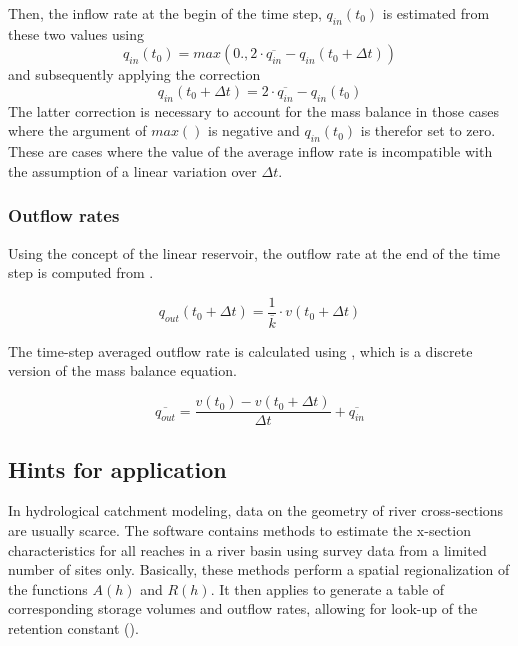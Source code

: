 Then, the inflow rate at the begin of the time step, $q_{in}(t_0)$ is estimated from these two values using
\begin{equation*}
q_{in}(t_0)= max(0., 2 \cdot \overline{q_{in}} - q_{in}(t_0 + \Delta t))
\end{equation*}
and subsequently applying the correction
\begin{equation*}
q_{in}(t_0 + \Delta t)= 2 \cdot \overline{q_{in}} - q_{in}(t_0)
\end{equation*}
The latter correction is necessary to account for the mass balance in those cases where the \second{} argument of $max()$ is negative and $q_{in}(t_0)$ is therefor set to zero. These are cases where the value of the average inflow rate is incompatible with the assumption of a linear variation over $\Delta t$.

\subsubsection*{Outflow rates}

Using the concept of the linear reservoir, the outflow rate at the end of the time step is computed from .

\begin{equation} \label{eqn:chanFlow_singleRes_outflowEnd}
  q_{out}(t_0 + \Delta t)= \frac{1}{\overline{k}} \cdot v(t_0 + \Delta t)
\end{equation}

The time-step averaged outflow rate is calculated using , which is a discrete version of the mass balance equation.

\begin{equation} \label{eqn:chanFlow_singleRes_outflowAvg}
\overline{q_{out}}= \frac{v(t_0) - v(t_0 + \Delta t)}{\Delta t} + \overline{q_{in}}
\end{equation}


\subsection{Hints for application} \label{sec:chanFlow_singleRes_hints}

In hydrological catchment modeling, data on the geometry of river cross-sections are usually scarce. The  software \citep{Echse-Tools-Doc} contains methods to estimate the x-section characteristics for all reaches in a river basin using survey data from a limited number of sites only. Basically, these methods perform a spatial regionalization of the functions $A(h)$ and $R(h)$. It then applies  to generate a table of corresponding storage volumes and outflow rates, allowing for look-up of the retention constant ().
